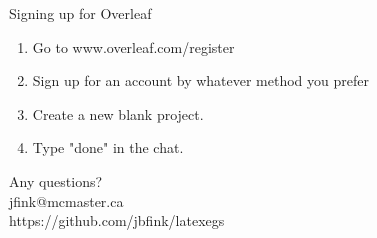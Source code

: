 \documentclass{beamer}
\begin{document}
\begin{frame}{Signing up for Overleaf}
	\begin{enumerate}
		\item Go to www.overleaf.com/register
		\item Sign up for an account by whatever method you prefer
		\item Create a new blank project.
		\item Type "done" in the chat.
	\end{enumerate}
\end{frame}


\begin{frame}
	Any questions?\\ 
	jfink@mcmaster.ca\\
	https://github.com/jbfink/latexegs 
	
\end{frame}
\end{document}
